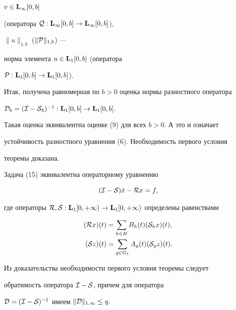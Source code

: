 $v\in\bold L_\infty[0,b]$


(оператора ${\cal Q}:\bold L_\infty[0,b]\to\bold L_\infty[0,b]$),


$\|u\|_{1,b}$ ($\|{\cal P}\|_{1,b}$) ---


норма элемента $u\in\bold L_1[0,b]$ (оператора 


${\cal P}:\bold L_1[0,b]\to\bold L_1[0,b]$).





Итак, получена равномерная по $b>0$ оценка нормы разностного оператора


${\cal D}_b=({\cal I-S}_b)^{-1}:\bold L_1[0,b]\to\bold L_1[0,b]$.


Такая оценка эквивалентна оценке (9) для всех $b>0$. А это и означает


устойчивость разностного уравнения (6). Необходимость первого условия


теоремы доказана.





Задача (15) эквивалентна операторному уравнению


%


\begin{equation}


({\cal I-S})\Dot x-{\cal R}x=f,


\end{equation}


%


где операторы ${\cal R,S}:\bold L_1[0,+\infty)\to\bold L_1[0,


+\infty)$ определены равенствами


%


\begin{align*}


({\cal R}x)(t) &=\sum_{h\in H}B_h(t)({\cal S}_hx)(t),\\


({\cal S}z)(t) &=\sum_{g\in G_1}A_g(t)({\cal S}_gz)(t).


\end{align*}





Из доказательства необходимости первого условия теоремы следует


обратимость оператора ${\cal I-S}$, причем для оператора


${\cal D}=({\cal I-S})^{-1}$ имеем $\|{\cal D}\|_{1,\infty}\le q.$





